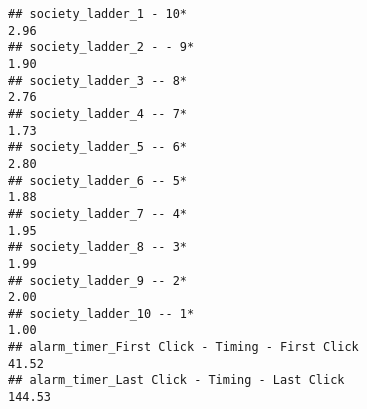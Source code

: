 \documentclass[
]{article}
\begin{document}
\begin{verbatim}
## society_ladder_1 - 10*                                                                                                                                                                                                        2.96
## society_ladder_2 - - 9*                                                                                                                                                                                                       1.90
## society_ladder_3 -- 8*                                                                                                                                                                                                        2.76
## society_ladder_4 -- 7*                                                                                                                                                                                                        1.73
## society_ladder_5 -- 6*                                                                                                                                                                                                        2.80
## society_ladder_6 -- 5*                                                                                                                                                                                                        1.88
## society_ladder_7 -- 4*                                                                                                                                                                                                        1.95
## society_ladder_8 -- 3*                                                                                                                                                                                                        1.99
## society_ladder_9 -- 2*                                                                                                                                                                                                        2.00
## society_ladder_10 -- 1*                                                                                                                                                                                                       1.00
## alarm_timer_First Click - Timing - First Click                                                                                                                                                                               41.52
## alarm_timer_Last Click - Timing - Last Click                                                                                                                                                                                144.53

\end{verbatim}
\end{document}
